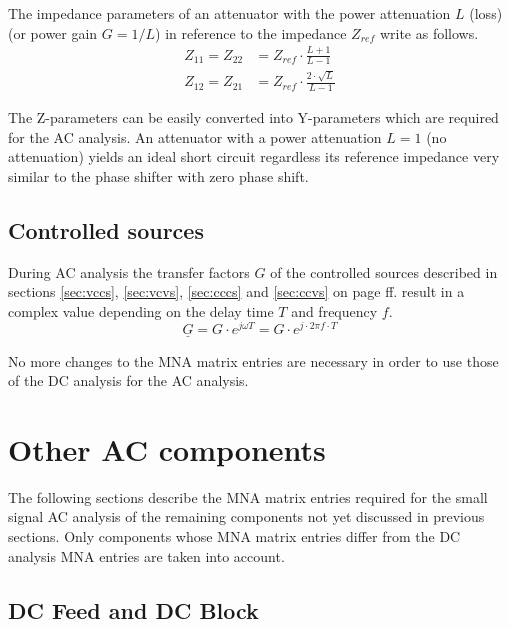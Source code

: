 The impedance parameters of an attenuator with the power attenuation
$L$ (loss) (or power gain $G=1/L$) in reference to the impedance
$Z_{ref}$ write as follows.
\begin{align}
Z_{11} = Z_{22} &= Z_{ref}\cdot\frac{L+1}{L-1}\\
Z_{12} = Z_{21} &= Z_{ref}\cdot\frac{2\cdot\sqrt{L}}{L-1}
\end{align}

The Z-parameters can be easily converted into Y-parameters which are
required for the AC analysis.  An attenuator with a power attenuation
$L=1$ (no attenuation) yields an ideal short circuit regardless its
reference impedance very similar to the phase shifter with zero phase
shift.

\subsection{Controlled sources}

During AC analysis the transfer factors $G$ of the controlled sources
described in sections \ref{sec:vccs}, \ref{sec:vcvs}, \ref{sec:cccs}
and \ref{sec:ccvs} on page \pageref{sec:vccs} ff. result in a complex
value depending on the delay time $T$ and frequency $f$.
\begin{equation}
\underline{G} = G\cdot e^{j\omega T} = G\cdot e^{j\cdot 2\pi f\cdot T}
\end{equation}

No more changes to the MNA matrix entries are necessary in order to
use those of the DC analysis for the AC analysis.

\section{Other AC components}

The following sections describe the MNA matrix entries required for
the small signal AC analysis of the remaining components not yet
discussed in previous sections.  Only components whose MNA matrix
entries differ from the DC analysis MNA entries are taken into
account.

\subsection{DC Feed and DC Block}

